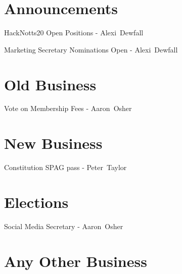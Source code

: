 \documentclass[11pt,hacksoc,agenda]{meetingmins}
\begin{document}
\maketitle

\section{Announcements}
\begin{items}
\item{HackNotts20 Open Positions - Alexi~Dewfall}
\item{Marketing Secretary Nominations Open - Alexi~Dewfall}
\end{items}

\section{Old Business}
\begin{items}
\item {Vote on Membership Fees - Aaron~Osher} 
\end{items}

\section{New Business}
\begin{items}
\item {Constitution SPAG pass - Peter~Taylor}
\end{items}

\section{Elections}
\begin{items}
\item {Social Media Secretary - Aaron~Osher}
\end{items}

\section{Any Other Business}

\vspace{1em}
\nextmeeting{}
\end{document}
